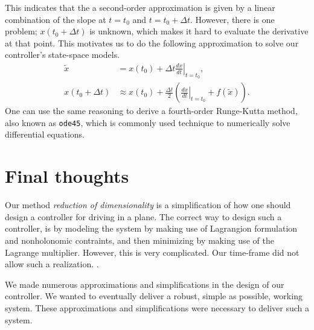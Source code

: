\documentclass[11pt,titlepage]{report}
\begin{document}
This indicates that the a second-order approximation is given by a linear combination of the slope at $t=t_0$ and $t=t_0+\Delta t$. However, there is one problem; $x(t_0 + \Delta t)$ is unknown, which makes it hard to evaluate the derivative at that point. This motivates us to do the following approximation to solve our controller's state-space models.
\begin{align}
\tilde{x} &= x(t_0)+ \Delta t \left. \frac{dx}{dt} \right|_{t=t_0}, \nonumber \\
x(t_0+\Delta t) &\approx x(t_0) + \frac{\Delta t}{2}\left(\left. \frac{dx}{dt} \right|_{t=t_0} + f(\tilde{x})\right).\nonumber 
\end{align}
One can use the same reasoning to derive a fourth-order Runge-Kutta method, also known as \texttt{ode45}, which is commonly used technique to numerically solve differential equations.

\section{Final thoughts}
Our method \textit{reduction of dimensionality} is a simplification of how one should design a controller for driving in a plane. The correct way to design such a controller, is by modeling the system by making use of Lagrangion formulation and nonholonomic contraints, and then minimizing by making use of the Lagrange multiplier. However, this is very complicated. Our time-frame did not allow such a realization. \cite{epo4-manual}.

We made numerous approximations and simplifications in the design of our controller. We wanted to eventually deliver a robust, simple as possible, working system. These approximations and simplifications were necessary to deliver such a system.
\end{document}
